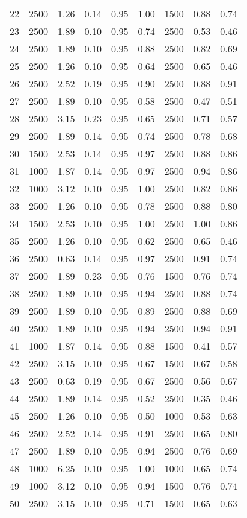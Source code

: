 \begin{tabular}{lrrrrrrrr}
22 &  2500 &  1.26 &  0.14 &  0.95 &  1.00 &  1500 &  0.88 &  0.74 \\
23 &  2500 &  1.89 &  0.10 &  0.95 &  0.74 &  2500 &  0.53 &  0.46 \\
24 &  2500 &  1.89 &  0.10 &  0.95 &  0.88 &  2500 &  0.82 &  0.69 \\
25 &  2500 &  1.26 &  0.10 &  0.95 &  0.64 &  2500 &  0.65 &  0.46 \\
26 &  2500 &  2.52 &  0.19 &  0.95 &  0.90 &  2500 &  0.88 &  0.91 \\
27 &  2500 &  1.89 &  0.10 &  0.95 &  0.58 &  2500 &  0.47 &  0.51 \\
28 &  2500 &  3.15 &  0.23 &  0.95 &  0.65 &  2500 &  0.71 &  0.57 \\
29 &  2500 &  1.89 &  0.14 &  0.95 &  0.74 &  2500 &  0.78 &  0.68 \\
30 &  1500 &  2.53 &  0.14 &  0.95 &  0.97 &  2500 &  0.88 &  0.86 \\
31 &  1000 &  1.87 &  0.14 &  0.95 &  0.97 &  2500 &  0.94 &  0.86 \\
32 &  1000 &  3.12 &  0.10 &  0.95 &  1.00 &  2500 &  0.82 &  0.86 \\
33 &  2500 &  1.26 &  0.10 &  0.95 &  0.78 &  2500 &  0.88 &  0.80 \\
34 &  1500 &  2.53 &  0.10 &  0.95 &  1.00 &  2500 &  1.00 &  0.86 \\
35 &  2500 &  1.26 &  0.10 &  0.95 &  0.62 &  2500 &  0.65 &  0.46 \\
36 &  2500 &  0.63 &  0.14 &  0.95 &  0.97 &  2500 &  0.91 &  0.74 \\
37 &  2500 &  1.89 &  0.23 &  0.95 &  0.76 &  1500 &  0.76 &  0.74 \\
38 &  2500 &  1.89 &  0.10 &  0.95 &  0.94 &  2500 &  0.88 &  0.74 \\
39 &  2500 &  1.89 &  0.10 &  0.95 &  0.89 &  2500 &  0.88 &  0.69 \\
40 &  2500 &  1.89 &  0.10 &  0.95 &  0.94 &  2500 &  0.94 &  0.91 \\
41 &  1000 &  1.87 &  0.14 &  0.95 &  0.88 &  1500 &  0.41 &  0.57 \\
42 &  2500 &  3.15 &  0.10 &  0.95 &  0.67 &  1500 &  0.67 &  0.58 \\
43 &  2500 &  0.63 &  0.19 &  0.95 &  0.67 &  2500 &  0.56 &  0.67 \\
44 &  2500 &  1.89 &  0.14 &  0.95 &  0.52 &  2500 &  0.35 &  0.46 \\
45 &  2500 &  1.26 &  0.10 &  0.95 &  0.50 &  1000 &  0.53 &  0.63 \\
46 &  2500 &  2.52 &  0.14 &  0.95 &  0.91 &  2500 &  0.65 &  0.80 \\
47 &  2500 &  1.89 &  0.10 &  0.95 &  0.94 &  2500 &  0.76 &  0.69 \\
48 &  1000 &  6.25 &  0.10 &  0.95 &  1.00 &  1000 &  0.65 &  0.74 \\
49 &  1000 &  3.12 &  0.10 &  0.95 &  0.94 &  1500 &  0.76 &  0.74 \\
50 &  2500 &  3.15 &  0.10 &  0.95 &  0.71 &  1500 &  0.65 &  0.63 \\
\bottomrule
\end{tabular}
